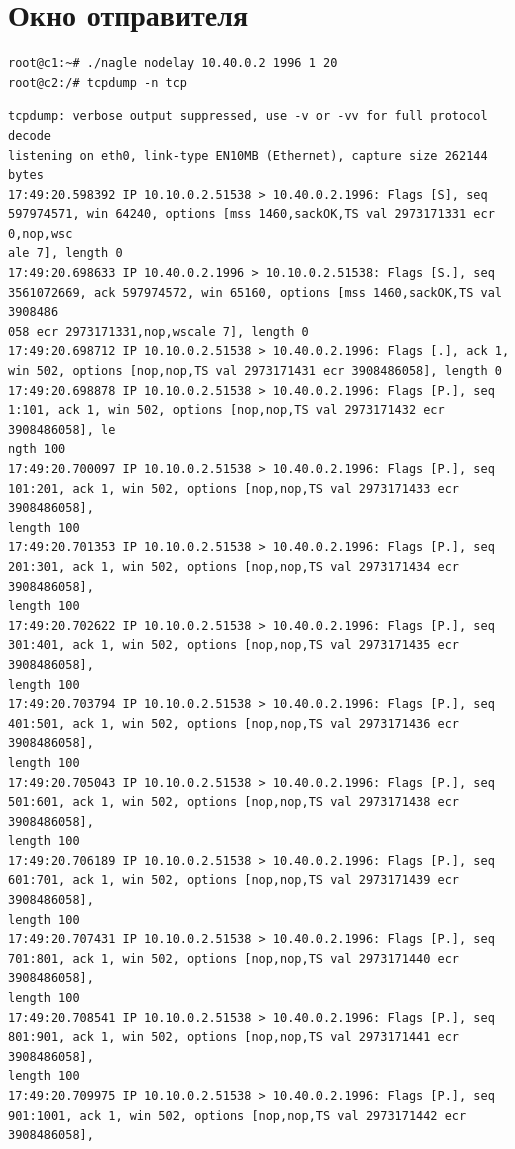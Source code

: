 \documentclass[a4paper,12pt]{article}
\begin{document}
\section{Окно отправителя}

\begin{Verbatim}
root@c1:~# ./nagle nodelay 10.40.0.2 1996 1 20
root@c2:/# tcpdump -n tcp
\end{Verbatim}

\begin{Verbatim}
tcpdump: verbose output suppressed, use -v or -vv for full protocol decode
listening on eth0, link-type EN10MB (Ethernet), capture size 262144 bytes
17:49:20.598392 IP 10.10.0.2.51538 > 10.40.0.2.1996: Flags [S], seq 597974571, win 64240, options [mss 1460,sackOK,TS val 2973171331 ecr 0,nop,wsc
ale 7], length 0
17:49:20.698633 IP 10.40.0.2.1996 > 10.10.0.2.51538: Flags [S.], seq 3561072669, ack 597974572, win 65160, options [mss 1460,sackOK,TS val 3908486
058 ecr 2973171331,nop,wscale 7], length 0
17:49:20.698712 IP 10.10.0.2.51538 > 10.40.0.2.1996: Flags [.], ack 1, win 502, options [nop,nop,TS val 2973171431 ecr 3908486058], length 0
17:49:20.698878 IP 10.10.0.2.51538 > 10.40.0.2.1996: Flags [P.], seq 1:101, ack 1, win 502, options [nop,nop,TS val 2973171432 ecr 3908486058], le
ngth 100
17:49:20.700097 IP 10.10.0.2.51538 > 10.40.0.2.1996: Flags [P.], seq 101:201, ack 1, win 502, options [nop,nop,TS val 2973171433 ecr 3908486058],
length 100
17:49:20.701353 IP 10.10.0.2.51538 > 10.40.0.2.1996: Flags [P.], seq 201:301, ack 1, win 502, options [nop,nop,TS val 2973171434 ecr 3908486058],
length 100
17:49:20.702622 IP 10.10.0.2.51538 > 10.40.0.2.1996: Flags [P.], seq 301:401, ack 1, win 502, options [nop,nop,TS val 2973171435 ecr 3908486058],
length 100
17:49:20.703794 IP 10.10.0.2.51538 > 10.40.0.2.1996: Flags [P.], seq 401:501, ack 1, win 502, options [nop,nop,TS val 2973171436 ecr 3908486058],
length 100
17:49:20.705043 IP 10.10.0.2.51538 > 10.40.0.2.1996: Flags [P.], seq 501:601, ack 1, win 502, options [nop,nop,TS val 2973171438 ecr 3908486058],
length 100
17:49:20.706189 IP 10.10.0.2.51538 > 10.40.0.2.1996: Flags [P.], seq 601:701, ack 1, win 502, options [nop,nop,TS val 2973171439 ecr 3908486058],
length 100
17:49:20.707431 IP 10.10.0.2.51538 > 10.40.0.2.1996: Flags [P.], seq 701:801, ack 1, win 502, options [nop,nop,TS val 2973171440 ecr 3908486058],
length 100
17:49:20.708541 IP 10.10.0.2.51538 > 10.40.0.2.1996: Flags [P.], seq 801:901, ack 1, win 502, options [nop,nop,TS val 2973171441 ecr 3908486058],
length 100
17:49:20.709975 IP 10.10.0.2.51538 > 10.40.0.2.1996: Flags [P.], seq 901:1001, ack 1, win 502, options [nop,nop,TS val 2973171442 ecr 3908486058],

\end{Verbatim}
\end{document}
